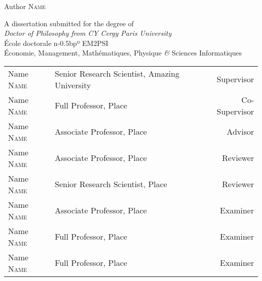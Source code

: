 \thispagestyle{empty}

\begin{fullwidth}
\begingroup
    \centering 
    \vspace*{90px}

    {\Huge \textcolor{ceruleanblue}{} \par}
    \vspace*{14px}
    {\LARGE \textcolor{ceruleanblue}{}}
    
    \vfill
    {\Huge {}} \vfill
    {\Large Author \textsc{Name}}\\[2\baselineskip]
    \vfill
    
    {\large A dissertation submitted for the degree of \\
    \textit{Doctor of Philosophy from CY Cergy Paris University} \\[1\baselineskip]
    École doctorale n\kern-0.5bpº EM2PSI \\
    \small Économie, Management, Mathématiques, Physique \textit{\&} Sciences Informatiques
    \par}\vfill
    
    \begin{tabular}{llr}
		Name \textsc{Name} & Senior Research Scientist, Amazing University & Supervisor \\
		Name \textsc{Name} & Full Professor, Place & Co-Supervisor \\
		Name \textsc{Name} & Associate Professor, Place & Advisor \\
	\midrule
	    Name \textsc{Name} & Associate Professor, Place & Reviewer \\
        Name \textsc{Name} & Senior Research Scientist, Place & Reviewer \\
        Name \textsc{Name} & Associate Professor, Place & Examiner \\
	    Name \textsc{Name} & Full Professor, Place & Examiner \\
	    Name \textsc{Name} & Full Professor, Place & Examiner \\
	\end{tabular}
    
    \vspace*{10px}
\endgroup
\end{fullwidth}

\newpage
\begin{fullwidth}
~\vfill
\thispagestyle{empty}
\setlength{\parindent}{0pt}
\setlength{\parskip}{\baselineskip}
\end{fullwidth}

